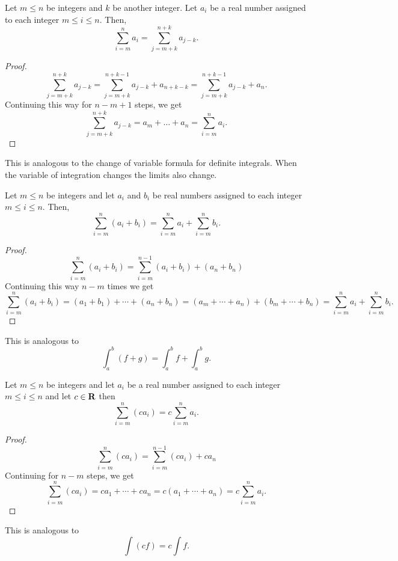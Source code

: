 \begin{lem}\label{c6s1l2}
Let $m \le n$ be integers and $k$ be another integer. Let $a_i$ be a real
number assigned to each integer $m \le i \le n$. Then,
\[
\sum_{i=m}^n a_i = \sum_{j=m+k}^{n+k}a_{j-k}.
\]
\end{lem}
\begin{proof}
\[
\sum_{j=m+k}^{n+k}a_{j-k} = \sum_{j=m+k}^{n+k-1}a_{j-k} + a_{n+k-k} =
\sum_{j=m+k}^{n+k-1}a_{j-k} + a_n.
\]
Continuing this way for $n - m + 1$ steps, we get
\[
\sum_{j=m+k}^{n+k}a_{j-k} = a_m + \ldots + a_n = \sum_{i=m}^n a_i.
\]
\end{proof}
\begin{rem}
This is analogous to the change of variable formula for definite integrals.
When the variable of integration changes the limits also change.
\end{rem}

\begin{lem}\label{c6s1l3}
Let $m \le n$ be integers and let $a_i$ and $b_i$ be real numbers assigned 
to each integer $m \le i \le n$. Then,
\[
\sum_{i=m}^n (a_i + b_i) = \sum_{i=m}^n a_i + \sum_{i=m}^n b_i.
\]
\end{lem}
\begin{proof}
\[
\sum_{i=m}^n (a_i + b_i) = \sum_{i=m}^{n-1} (a_i + b_i) + (a_n + b_n)
\]
Continuing this way $n - m$ times we get
\[
\sum_{i=m}^n (a_i + b_i) = (a_1 + b_1) + \cdots + (a_n + b_n) = (a_m +
\cdots + a_n) + (b_m + \cdots + b_n) = \sum_{i=m}^n a_i + \sum_{i=m}^n b_i.
\]
\end{proof}
\begin{rem}
This is analogous to
\[
\int_a^b (f + g) = \int_a^b f + \int_a^b g.
\]
\end{rem}

\begin{lem}\label{c6s1l4}
Let $m \le n$ be integers and let $a_i$ be a real number assigned to each 
integer $m \le i \le n$ and let $c \in \mathbf{R}$ then
\[
\sum_{i=m}^n (ca_i) = c\sum_{i=m}^n a_i.
\]
\end{lem}
\begin{proof}
\[
\sum_{i=m}^n (ca_i) = \sum_{i=m}^{n-1} (ca_i) + ca_n 
\]
Continuing for $n - m$ steps, we get
\[
\sum_{i=m}^n (ca_i) = ca_1 + \cdots + ca_n = c(a_1 + \cdots + a_n) = 
c\sum_{i=m}^n a_i.
\]
\end{proof}
\begin{rem}
This is analogous to
\[
\int (cf) = c\int f.
\]
\end{rem}

